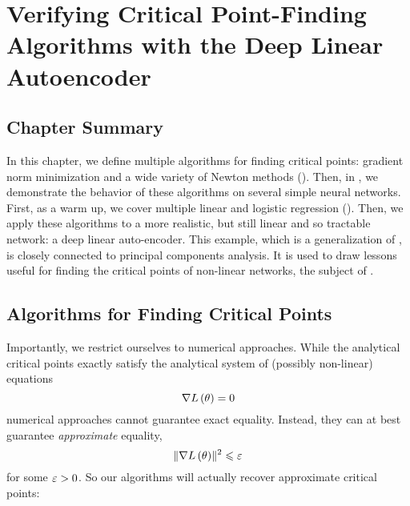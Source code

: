 \documentclass[../../thesis.tex]{subfiles}
\begin{document}
\chapter{Verifying
Critical Point-Finding Algorithms
with the Deep Linear Autoencoder}
\onlyinsubfile{\begin{KeepFromToc}
		\tableofcontents
		\clearpage
		\listoffigures
		\listoftables
	\end{KeepFromToc}}
\onlyinsubfile{\clearpage}
\onlyinsubfile{\linenumbers}

\section{Chapter Summary}

In this chapter,
we define multiple algorithms for finding critical points:
gradient norm minimization
and a wide variety of Newton methods
().
Then, in ,
we demonstrate the behavior of these algorithms
on several simple neural networks.
First, as a warm up,
we cover multiple linear and logistic regression
().
Then, we apply these algorithms to a more realistic,
but still linear and so tractable network:
a deep linear auto-encoder.
This example, which is
a generalization of ,
is closely connected to principal components analysis.
It is used to draw lessons useful
for finding the critical points of non-linear networks,
the subject of .

\section{Algorithms for Finding Critical Points}

Importantly, we restrict ourselves to numerical approaches.
While the analytical critical points exactly satisfy
the analytical system of (possibly non-linear) equations
\begin{equation}\equationlabel{gradienteqns}
	\grad{L}{\theta} = 0
\end{equation}
\noindent numerical approaches cannot guarantee
exact equality.
Instead, they can at best guarantee \emph{approximate} equality,
\begin{equation}\equationlabel{gradienteps}
	\sgn{L}{\theta} \leq \eps
\end{equation}
\noindent for some $\varepsilon > 0$.
So our algorithms will actually recover approximate critical points:
\end{document}

